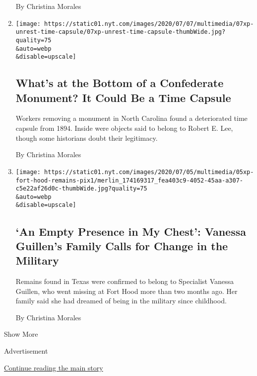 \begin{enumerate}
  By Christina Morales
\item
  \href{/2020/07/08/us/confederate-monument-robert-lee-north-carolina.html}{}

  \texttt{[image: https://static01.nyt.com/images/2020/07/07/multimedia/07xp-unrest-time-capsule/07xp-unrest-time-capsule-thumbWide.jpg?quality=75\\\&auto=webp\\\&disable=upscale]}

  \hypertarget{whats-at-the-bottom-of-a-confederate-monument-it-could-be-a-time-capsule}{%
  \subsection{What's at the Bottom of a Confederate Monument? It Could
  Be a Time
  Capsule}\label{whats-at-the-bottom-of-a-confederate-monument-it-could-be-a-time-capsule}}

  Workers removing a monument in North Carolina found a deteriorated
  time capsule from 1894. Inside were objects said to belong to Robert
  E. Lee, though some historians doubt their legitimacy.

  By Christina Morales
\item
  \href{/2020/07/06/us/fort-hood-soldier-vanessa-guillen-remains-found.html}{}

  \texttt{[image: https://static01.nyt.com/images/2020/07/05/multimedia/05xp-fort-hood-remains-pix1/merlin\_174169317\_fea403c9-4052-45aa-a307-c5e22af26d0c-thumbWide.jpg?quality=75\\\&auto=webp\\\&disable=upscale]}

  \hypertarget{an-empty-presence-in-my-chest-vanessa-guillens-family-calls-for-change-in-the-military}{%
  \subsection{`An Empty Presence in My Chest': Vanessa Guillen's Family
  Calls for Change in the
  Military}\label{an-empty-presence-in-my-chest-vanessa-guillens-family-calls-for-change-in-the-military}}

  Remains found in Texas were confirmed to belong to Specialist Vanessa
  Guillen, who went missing at Fort Hood more than two months ago. Her
  family said she had dreamed of being in the military since childhood.

  By Christina Morales
\end{enumerate}

Show More

Advertisement

\protect\hyperlink{after-mid2}{Continue reading the main story}

